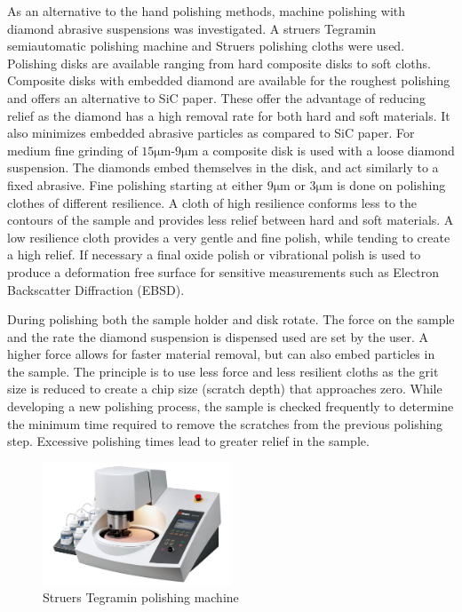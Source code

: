 As an alternative to the hand polishing methods, machine polishing with diamond abrasive suspensions was investigated. A struers Tegramin semiautomatic polishing machine and Struers polishing cloths were used. Polishing disks are available ranging from hard composite disks to soft cloths. Composite disks with embedded diamond are available for the roughest polishing and offers an alternative to SiC paper. These offer the advantage of reducing relief as the diamond has a high removal rate for both hard and soft materials. It also minimizes embedded abrasive particles as compared to SiC paper. For medium fine grinding of $15\si{\micro\meter}$-$9\si{\micro\meter}$ a composite disk is used with a loose diamond suspension. The diamonds embed themselves in the disk, and act similarly to a fixed abrasive. Fine polishing starting at either $9 \si{\micro\meter}$ or $3\si{\micro\meter}$ is done on polishing clothes of different resilience. A cloth of high resilience conforms less to the contours of the sample and provides less relief between hard and soft materials. A low resilience cloth provides a very gentle and fine polish, while tending to create a high relief. If necessary a final oxide polish or vibrational polish is used to produce a deformation free surface for sensitive measurements such as Electron Backscatter Diffraction (EBSD). 

During polishing both the sample holder and disk rotate. The force on the sample and the rate the diamond suspension is dispensed used are set by the user. A higher force allows for faster material removal, but can also embed particles in the sample. The principle is to use less force and less resilient cloths as the grit size is reduced to create a chip size (scratch depth) that approaches zero. While developing a new polishing process, the sample is checked frequently to determine the minimum time required to remove the scratches from the previous polishing step. Excessive polishing times lead to greater relief in the sample. 





\begin{figure}[h!]
    \centering
    \includegraphics[width=0.5\textwidth]{fig/polishing/Tegramin.jpg}
    \caption{Struers Tegramin polishing machine}
    \label{fig:tegramin}
\end{figure}


